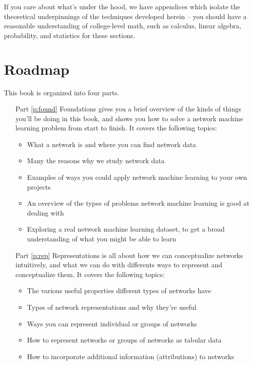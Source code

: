 If you care about what's under the hood, we have appendices which isolate the theoretical underpinnings of the techniques developed herein -- you should have a reasonable understanding of college-level math, such as calculus, linear algebra, probability, and statistics for these sections.

\section*{Roadmap}

This book is organized into four parts.

\begin{itemize}[leftmargin=1cm]
    \item [Part \ref{p:found}] Foundations gives you a brief overview of the kinds of things you'll be doing in this book, and shows you how to solve a network machine learning problem from start to finish. It covers the following topics:
    \begin{itemize}
        \item What a network is and where you can find network data
        \item Many the reasons why we study network data
        \item Examples of ways you could apply network machine learning to your own projects
        \item An overview of the types of problems network machine learning is good at dealing with
        \item Exploring a real network machine learning dataset, to get a broad understanding of what you might be able to learn
    \end{itemize}
    \item [Part \ref{p:rep}] Representations is all about how we can conceptualize networks intuitively, and what we can do with differents ways to represent and conceptualize them. It covers the following topics:
    \begin{itemize}
        \item The various useful properties different types of networks have
        \item Types of network representations and why they're useful
        \item Ways you can represent individual or groups of networks
        \item How to represent networks or groups of networks as tabular data
        \item How to incorporate additional information (attributions) to networks

\end{itemize}
\end{itemize}
